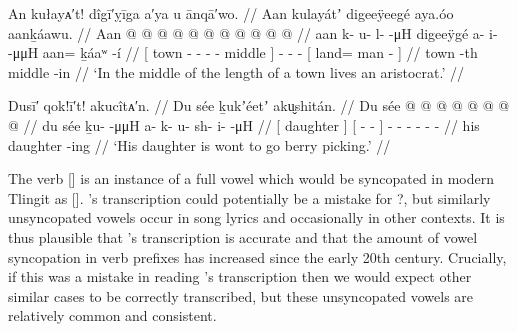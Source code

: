 \ex\label{ex:89-1-long-town-chief}%
%
\begingl
	\glpreamble	An kułayᴀ′t! dîgī′ỵīga a′ya u ānqā′wo. //
	\glpreamble	Aan kulayátʼ digeeÿeegé aya.óo aanḵáawu. //
	\gla	{} Aan  @ {} @ {} @ {} @ {} @ {}  @ {} {}
		 @ {} @ {} @ {}
		{}  @ {} @ {} {} //
	\glb	{} aan k- u- l-  -μH {} digeeÿgé {} {}
		a- i-  -μμH
		{} aan= ḵáaʷ -í {} //
	\glc	{}[ town - - -  - \· middle \· {}]
		- -  -
		{}[ land= man - {}] //
	\gld	{} town  {} {} {} {} -th middle -in {}
		 {} {} {}
		{}  {} {} {} //
	\glft	‘In the middle of the length of a town lives an aristocrat.’
		//
\endgl
\xe

\ex\label{ex:89-2-daughter-berry-picking}%
%
\begingl
	\glpreamble	Dusī′ qok!ī′t! akucîtᴀ′n. //
	\glpreamble	Du sée ḵukʼéetʼ aku̬shitán. //
	\gla	{} Du sée {}
		{}  @ {} @ {} {} {}
		 @ {} @ {} @ {} @ {} @ {} @ {} //
	\glb	{} du sée {} 
		{} ḵu-  -μμH {} {}
		a- k- u- sh- i-  -μH //
	\glc	{}[  daughter {}]
		{}[ -  - \· {}]
		- - - - -  - //
	\gld	{} his daughter {}
		{}  {} {} -ing {}
		 {} {} {} {} {} {} //
	\glft	‘His daughter is wont to go berry picking.’
		//
\endgl
\xe

The verb  [] is an instance of a full vowel which would be syncopated in modern Tlingit as  [].
\citeauthor{swanton:1909}’s transcription  could potentially be a mistake for ?, but similarly unsyncopated vowels occur in song lyrics and occasionally in other contexts.
It is thus plausible that \citeauthor{swanton:1909}’s transcription is accurate and that the amount of vowel syncopation in verb prefixes has increased since the early 20th century.
Crucially, if this was a mistake in reading \citeauthor{swanton:1909}’s transcription then we would expect other similar cases to be correctly transcribed, but these unsyncopated vowels are relatively common and consistent.


